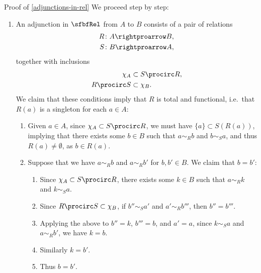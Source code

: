 \begin{Proof}{Proof of \cref{adjunctions-in-rel}}%
    We proceed step by step:
    \begin{enumerate}%
        \item{}An adjunction in $\sfbfRel$ from $A$ to $B$ consists of a pair of relations
            \begin{align*}
                R &\colon A\rightproarrow B,\\
                S &\colon B\rightproarrow A,
            \end{align*}
            together with inclusions
            \begin{align*}
                \chi_{A}    &\subset S\procirc R,\\
                R\procirc S &\subset \chi_{B}.
            \end{align*}
            We claim that these conditions imply that $R$ is total and functional, i.e.\ that $R(a)$ is a singleton for each $a\in A$:
            \begin{enumerate}%
                \item{}Given $a\in A$, since $\chi_{A}\subset S\procirc R$, we must have $\{a\}\subset S(R(a))$, implying that there exists some $b\in B$ such that $a\sim_{R}b$ and $b\sim_{S}a$, and thus $R(a)\neq\emptyset$, as $b\in R(a)$.
                \item{}Suppose that we have $a\sim_{R}b$ and $a\sim_{R}b'$ for $b,b'\in B$. We claim that $b=b'$:
                    \begin{enumerate}%
                        \item Since $\chi_{A}\subset S\procirc R$, there exists some $k\in B$ such that $a\sim_{R}k$ and $k\sim_{S}a$.
                        \item Since $R\procirc S\subset\chi_{B}$, if $b''\sim_{S}a'$ and $a'\sim_{R}b'''$, then $b''=b'''$.
                        \item Applying the above to $b''=k$, $b'''=b$, and $a'=a$, since $k\sim_{S}a$ and $a\sim_{R}b'$, we have $k=b$.
                        \item Similarly $k=b'$.
                        \item Thus $b=b'$.
                    \end{enumerate}%
            \end{enumerate}%

\end{enumerate}
\end{Proof}
